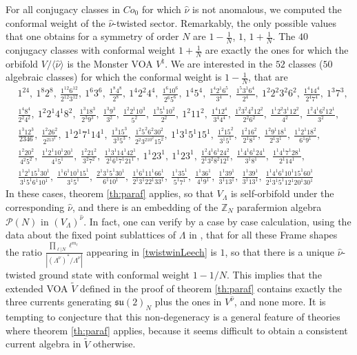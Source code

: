 \documentclass[11pt,reqno]{article}
\newcommand{\ZZ}{\mathbb{Z}}
\newcommand{\paraf}{\mathcal{P}}
\newcommand{\alg}[1]{\mathfrak{#1}}
\begin{document}
For all conjugacy classes in $Co_0$ for which $\hat\nu$ is not anomalous, we computed the conformal weight of the $\hat\nu$-twisted sector. Remarkably, the only possible values that one obtains for a symmetry of order $N$ are $1-\frac{1}{N}$, $1$, $1+\frac{1}{N}$. The $40$ conjugacy classes with conformal weight  $1+\frac{1}{N}$ are exactly the ones for which the orbifold $V/\langle \hat\nu\rangle$ is the Monster VOA $V^\natural$. We are interested in the $52$ classes ($50$ algebraic classes) for which the conformal weight is $1-\frac{1}{N}$, that are
\begin{align}\label{paraclasses}
&1^{24},\ 1^8 2^8,\ \frac{1^{12} 6^{12}}{2^{12} 3^{12}},\ 1^6 3^6,\ \frac{1^8
	4^8}{2^8},\ 1^4 2^2 4^4,\ \frac{1^6 10^6}{2^6 5^6},\ 1^4 5^4,\ \frac{1^4 2^1 
	6^5}{3^4},\ \frac{1^5 3^1 6^4}{2^4},\ 1^2 2^2 3^2 6^2,\ \frac{1^4 14^4}{2^4 7^4},\ 1^3
7^3,\nonumber\\& \frac{1^4 8^4}{2^2 4^2},\ 1^2 2^1 4^1 8^2,\ \frac{1^3 18^3}{2^3 9^3},\ \frac{1^3
	9^3}{3^2},\ \frac{1^2 2^1  10^3}{5^2},\ \frac{1^3 5^1  10^2}{2^2},\ 1^2 11^2,\ \frac{1^4
	12^4}{3^4 4^4},\ \frac{1^2  3^2 4^2 12^2}{2^2 6^2},\ \frac{1^1 2^2
	3^1 12^2}{4^2},\ \frac{1^2 4^1 6^2 12^1}{3^2},\nonumber\\ &\frac{1^3 12^3}{2 3 4 6},\ \frac{1^2
	26^2}{ 2^213^2},\ 1^1 2^1 7^1 14^1,\ \frac{1^3 15^3}{3^3 5^3},\ \frac{1^2 5^2
	6^2 30^2}{ 2^2 3^210^2 15^2},\ 1^1 3^1 5^1 15^1,\ \frac{1^2 15^2}{3^1 5^1},\ \frac{1^2 16^2}{2^1
	8^1},\ \frac{1^2 9^1 18^1}{2^1 3^1},\ \frac{1^1 2^1 18^2}{6^1 9^1},\nonumber\\ &\frac{1^2 20^2}{4^2 5^2},\ \frac{1^1 2^1
	10^1  20^1}{4^1 5^1},\ \frac{1^2 21^2}{3^2 7^2},\ \frac{1^1 3^1  14^1 42^1}{2^1 6^1 7^1 21^1},\ 1^1 23^1,\ 1^1
23^1,\ \frac{1^2 4^1 6^1 24^2}{ 2^1 3^2 8^2 12^1},\ \frac{1^1 4^1 6^1 24^1}{3^1 8^1},\ \frac{1^1 4^1 7^1 28^1}{
	2^1 14^1},\\ &\frac{1^1 2^1  15^1 30^1}{ 3^1 5^1 6^1 10^1},\ \frac{1^1 6^1 10^1 15^1}{3^1 5^1},\ \frac{2^1 3^1 5^1 30^1}{
	6^1 10^1},\ \frac{1^1 6^1 11^1 66^1}{2^1 3^1 22^1 33^1},\ \frac{1^1 35^1}{5^1 7^1},\ \frac{1^1 36^1}{4^1 9^1},\ \frac{1^1
	39^1}{ 3^1 13^1},\ \frac{1^1 39^1}{ 3^1 13^1},\ \frac{1^1 4^1 6^1 10^1 15^1 60^1}{2^1 3^1 5^1 12^1 20^1 30^1}\nonumber
\end{align} In these cases, theorem \ref{th:paraf} applies, so that $V_\Lambda$ is self-orbifold under the corresponding $\hat\nu$, and  there is an embedding of the $\ZZ_N$ parafermion algebra $\paraf(N)$ in $(V_\Lambda)^{\hat\nu}$. In fact, one can verify by a case by case calculation, using the data about the fixed point sublattices of $\Lambda$ in \cite{HoehnMason2016}, that for all these Frame shapes the ratio $\frac{\prod_{\ell|N}\ell^{m_\ell}}{|(\Lambda^\nu)^*/\Lambda^\nu|}$ appearing in \eqref{twistwinLeech} is $1$, so that there is a unique $\hat\nu$-twisted ground state with conformal weight $1-1/N$. This implies that the extended VOA $\tilde V$ defined in the proof of theorem \ref{th:paraf} contains exactly the three currents generating $\alg{su}(2)_N$ plus the ones in $V^{\hat\nu}$, and none more. It is tempting to conjecture that this non-degeneracy is a general feature of theories where theorem \ref{th:paraf} applies, because it seems difficult to obtain a consistent current algebra in $\tilde V$ otherwise.
\end{document}
